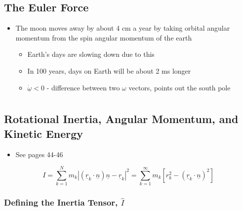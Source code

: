 \documentclass[a4paper,11pt,normalem]{article}
\begin{document}
\subsection{The Euler Force}\label{the-euler-force}

\begin{itemize}
\item
  The moon moves away by about 4 cm a year by taking orbital angular
  momentum from the spin angular momentum of the earth
  \begin{itemize}
  \item
    Earth's days are slowing down due to this
  \item
    In 100 years, days on Earth will be about 2 ms longer
  \item
    \(\underline{\dot{\omega}} < 0\) - difference between two \(\omega\)
    vectors, points out the south pole
  \end{itemize}
\end{itemize}

\section{}\label{lecture-16}

\subsection{Rotational Inertia, Angular Momentum, and Kinetic Energy}\label{rotational-inertia-angular-momentum-and-kinetic-energy}

\begin{itemize}
\item
  See pages 44-46
\end{itemize}

\[
    I = \sum_{k = 1}^N m_k|(\underline{r}_k \cdot \underline{n})\underline{n} - \underline{r}_k|^2 = \sum_{k = 1}^\infty m_k [r_k^2 - (\underline{r}_k \cdot \underline{n})^2]
\]

\subsubsection{\texorpdfstring{Defining the Inertia Tensor,
\(\hat{I}\)}{Defining the Inertia Tensor, \textbackslash{}hat\{I\}}}\label{defining-the-inertia-tensor-hati}
\end{document}
